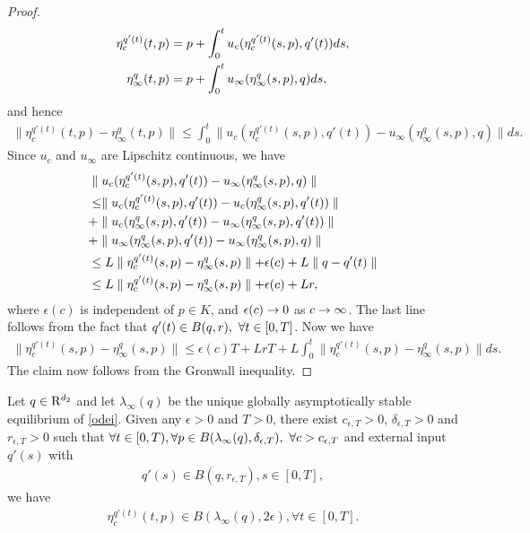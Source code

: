 \begin{proof}
\begin{align}
\eta^{q'(t)}_c(t,p)&=p+\int_0^t u_c(\eta^{q'(t)}_c(s,p),q'(t))ds,\nonumber\\
\eta^q_\infty(t,p)&=p+\int_0^t u_\infty(\eta^q_\infty(s,p),q)ds,
\end{align}
and hence
\begin{align}
\parallel \eta^{q'(t)}_c(t,p)-\eta^q_\infty(t,p)\parallel \leq \int_0^t \parallel u_c(\eta^{q'(t)}_c(s,p),
q'(t))-u_\infty(\eta^q_\infty(s,p),q)\parallel ds.
\end{align}
Since $u_c$ and $u_\infty$ are Lipschitz continuous, we have
\begin{align}
&\parallel u_c(\eta^{q'(t)}_c(s,p),q'(t))-u_\infty(\eta^q_\infty(s,p),q)\parallel \nonumber\\
&\leq \parallel u_c(\eta^{q'(t)}_c(s,p),q'(t))-u_c(\eta^q_\infty(s,p),q'(t))\parallel \nonumber\\
&+\parallel u_c(\eta^q_\infty(s,p),q'(t))-u_\infty(\eta^q_\infty(s,p),q'(t))\parallel \nonumber\\
&+\parallel u_\infty(\eta^q_\infty(s,p),q'(t))-u_\infty(\eta^q_\infty(s,p),q)\parallel \nonumber\\
&\leq L\parallel \eta^{q'(t)}_c(s,p)-\eta^q_\infty(s,p)\parallel +\epsilon(c)+L\parallel
q-q'(t)\parallel \nonumber\\
&\leq L\parallel \eta^{q'(t)}_c(s,p)-\eta^q_\infty(s,p)\parallel +\epsilon(c)+Lr,\nonumber
\end{align}
where $\epsilon(c)$ is independent of $p \in K$, and $\epsilon(c) \rightarrow 0$ as $c \rightarrow \infty$. The last line 
follows from the fact that $q'(t)\in B(q,r), \mbox{ } \forall t\in [0,T]$. Now we have
\begin{align}
\parallel \eta^{q'(t)}_c(s,p)-\eta^q_\infty(s,p)\parallel \leq \epsilon(c)T+Lr T +L\int^t_0\parallel
\eta^{q'(t)}_c(s,p)-\eta^q_\infty(s,p)\parallel ds.
\end{align}
The claim now follows from the Gronwall inequality.
\end{proof}
\begin{lemma}\label{within}
Let $q\in \mathrm{R}^{d_2}$ and let $\lambda_\infty(q)$ be the unique globally asymptotically stable equilibrium 
of \eqref{odei}. Given any $\epsilon >0$ and $T>0$, there exist $c_{\epsilon,T}> 0 $, $\delta_{\epsilon,T} 
> 0$ and $r_{\epsilon,T} > 0$ such that $\forall t\in [0,T), \forall p \in 
B(\lambda_\infty(q),\delta_{\epsilon,T}), \mbox{ } \forall c>c_{\epsilon,T}$ and external input $q'(s)$ with 
\begin{align}
q'(s) \in B(q,r_{\epsilon,T}), s\in [0,T],
\end{align}
we have
\begin{align}
\eta^{q'(t)}_c(t,p) \in B(\lambda_\infty(q),2\epsilon), \forall t \in [0,T].
\end{align}
\end{lemma}
